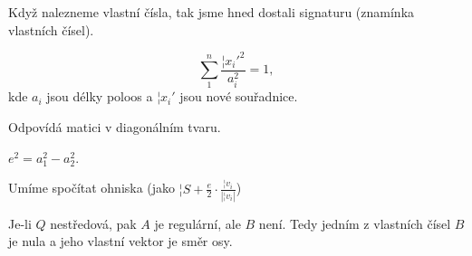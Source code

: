 \documentclass[12pt]{article}					%
\begin{document}
\begin{poznamka}
	Když nalezneme vlastní čísla, tak jsme hned dostali signaturu (znamínka vlastních čísel).
\end{poznamka}

\begin{definice}
	$$ \sum_1^n \frac{{¦x_i'}^2}{a_i^2} = 1, $$
	kde $a_i$ jsou délky poloos a $¦x_i'$ jsou nové souřadnice.

	\begin{dusledekin}
		Odpovídá matici v diagonálním tvaru.
	\end{dusledekin}
\end{definice}

\begin{tvrzeni}
	$e^2 = a_1^2 - a_2^2$.

	\begin{dusledek}
		Umíme spočítat ohniska (jako $¦S + \frac{e}{2}·\frac{¦v_i}{|¦v_i|}$)
	\end{dusledek}
\end{tvrzeni}

\begin{poznamka}[Nestředové]
	Je-li $Q$ nestředová, pak $A$ je regulární, ale $B$ není. Tedy jedním z vlastních čísel $B$ je nula a jeho vlastní vektor je směr osy.
\end{poznamka}
\end{document}
